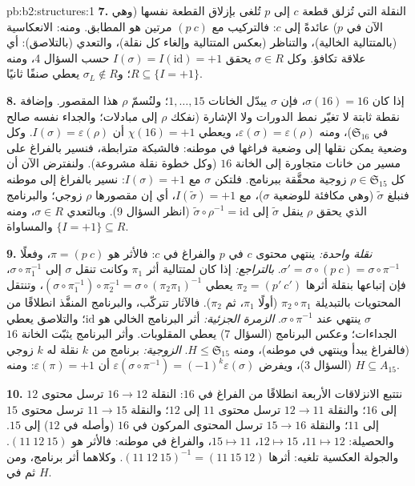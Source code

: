 \begin{solution}{pb:b2:structures:1}
\textbf{7.} النقلة التي تُزلق قطعة $c$ إلى $p$ تُلغى
بإزلاق القطعة نفسها (وهي الآن في $p$) عائدةً إلى $c$: فالتركيب
مع $(p\ c)$ مرتين هو المطابق. ومنه: الانعكاسية (بالمتتالية
الخالية)، والتناظر (بعكس المتتالية وإلغاء كل نقلة)،
والتعدي (بالتلاصق): أي علاقة تكافؤ. وكل
$\sigma \in R$ يحقق $I(\sigma) = I(\mathrm{id}) = +1$ حسب السؤال
4، ومنه $R \subseteq \{I = +1\}$؛ و$\sigma_L \notin R$ يعطي
صنفًا ثانيًا.

\textbf{8.} إذا كان $\sigma(16) = 16$، فإن $\sigma$ يبدّل
الخانات $1, \dots, 15$؛ ولنُسمّ $\rho$ هذا المقصور. وإضافة
نقطة ثابتة لا تغيّر نمط الدورات ولا الإشارة
(نفكك $\rho$ إلى مبادلات؛ والجداء نفسه صالح في
$\mathfrak{S}_{16}$)، ومنه $\varepsilon(\sigma) =
\varepsilon(\rho)$، ويعطي $\chi(16) = +1$ أن $I(\sigma) =
\varepsilon(\rho)$. وكل وضعية يمكن نقلها إلى وضعية
فراغها في موطنه: فالشبكة مترابطة، فنسير بالفراغ على
مسير من خانات متجاورة إلى الخانة $16$ (وكل خطوة نقلة مشروعة).
ولنفترض الآن أن كل $\rho \in \mathfrak{S}_{15}$ زوجية محقَّقة
ببرنامج. فلتكن $\sigma$ مع $I(\sigma) = +1$: نسير بالفراغ
إلى موطنه فنبلغ $\widetilde\sigma$ (وهي مكافئة للوضعية $\sigma$)،
مع $I(\widetilde\sigma) = +1$، أي إن مقصورها $\rho$
زوجي؛ والبرنامج الذي يحقق $\rho$ ينقل $\widetilde\sigma$ إلى
$\widetilde\sigma \circ \rho^{-1} = \mathrm{id}$ (انظر السؤال
9). وبالتعدي $\sigma \in R$، ومنه $\{I = +1\} \subseteq
R$ والمساواة.

\textbf{9.} \emph{نقلة واحدة:} ينتهي محتوى $c$ في $p$
والفراغ في $c$: فالأثر هو $\pi = (p\ c)$، وفعلًا
$\sigma' = \sigma \circ (p\ c) = \sigma \circ \pi^{-1}$.
\emph{بالتراجع:} إذا كان لمتتالية أثر $\pi_1$ وكانت تنقل
$\sigma$ إلى $\sigma \circ \pi_1^{-1}$، فإن إتباعها بنقلة
أثرها $\pi_2 = (p'\ c')$ يعطي $(\sigma \circ \pi_1^{-1})
\circ \pi_2^{-1} = \sigma \circ (\pi_2\pi_1)^{-1}$، وتنتقل المحتويات
بالتبديلة $\pi_2 \circ \pi_1$ (أولًا $\pi_1$، ثم $\pi_2$). فالآثار
تتركّب، والبرنامج المنفَّذ انطلاقًا من $\sigma$ ينتهي عند $\sigma
\circ \pi^{-1}$. \emph{الزمرة الجزئية:} أثر البرنامج الخالي هو
$\mathrm{id}$؛ والتلاصق يعطي الجداءات؛ وعكس البرنامج
(السؤال 7) يعطي المقلوبات. وأثر البرنامج يثبّت الخانة $16$
(فالفراغ يبدأ وينتهي في موطنه)، ومنه $H \leq \mathfrak{S}_{15}$.
\emph{الزوجية:} برنامج من $k$ نقلة له $k$ زوجي (السؤال
3)، ويفرض $\varepsilon(\sigma \circ \pi^{-1}) =
(-1)^k\varepsilon(\sigma)$ أن $\varepsilon(\pi) = +1$: ومنه $H
\subseteq A_{15}$.

\textbf{10.} نتتبع الانزلاقات الأربعة انطلاقًا من الفراغ في $16$: النقلة
$16 \to 12$ ترسل محتوى $12$ إلى $16$؛ والنقلة $12 \to 11$
ترسل محتوى $11$ إلى $12$؛ والنقلة $11 \to 15$ ترسل
محتوى $15$ إلى $11$؛ والنقلة $15 \to 16$ ترسل المحتوى
المركون في $16$ (وأصله في $12$) إلى $15$. والحصيلة: $11 \mapsto
12$، $12 \mapsto 15$، $15 \mapsto 11$، والفراغ في موطنه: فالأثر هو
$(11\ 12\ 15)$. والجولة العكسية تلغيه: أثرها $(11\ 12\
15)^{-1} = (11\ 15\ 12)$. وكلاهما أثر برنامج، ومن ثم في
$H$.


\end{solution}
